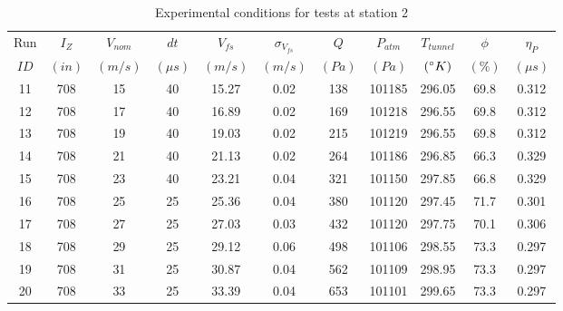 \begin{table}[H]
\begin{center}
\begin{tabular}{|ccccccccccc|}
	\hline
	Run & $I_Z$ & $V_{nom}$ & $dt$ & $V_{fs}$ & $\sigma_{V_{fs}}$ & $Q$ & $P_{atm}$ & $T_{tunnel}$ & $\phi$ & $\eta_P$\\
	$ID$ & $(in)$ & $(m/s)$ & $(\mu s)$ & $(m/s)$ & $(m/s)$ & $(Pa)$ & $(Pa)$ & $(\degree K)$ & $(\%)$ & $(\mu s)$\\
	\hline
	11 & 708 & 15 & 40 & 15.27 & 0.02 & 138 & 101185 & 296.05 & 69.8 & 0.312\\
	12 & 708 & 17 & 40 & 16.89 & 0.02 & 169 & 101218 & 296.55 & 69.8 & 0.312\\
	13 & 708 & 19 & 40 & 19.03 & 0.02 & 215 & 101219 & 296.55 & 69.8 & 0.312\\
	14 & 708 & 21 & 40 & 21.13 & 0.02 & 264 & 101186 & 296.85 & 66.3 & 0.329\\
	15 & 708 & 23 & 40 & 23.21 & 0.04 & 321 & 101150 & 297.85 & 66.8 & 0.329\\
	16 & 708 & 25 & 25 & 25.36 & 0.04 & 380 & 101120 & 297.45 & 71.7 & 0.301\\
	17 & 708 & 27 & 25 & 27.03 & 0.03 & 432 & 101120 & 297.75 & 70.1 & 0.306\\
	18 & 708 & 29 & 25 & 29.12 & 0.06 & 498 & 101106 & 298.55 & 73.3 & 0.297\\
	19 & 708 & 31 & 25 & 30.87 & 0.04 & 562 & 101109 & 298.95 & 73.3 & 0.297\\
	20 & 708 & 33 & 25 & 33.39 & 0.04 & 653 & 101101 & 299.65 & 73.3 & 0.297\\
	\hline
\end{tabular}
\caption{Experimental conditions for tests at station 2}
\label{table:station_2_measurements}
\end{center}
\end{table}
